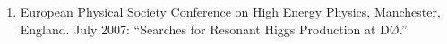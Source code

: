 \documentclass[amsmath,amssymb]{revtex4}
\def\dzero{D\O}
\begin{document}
\begin{enumerate}
``Radiation Damage Study of the \dzero\ Silicon Microstrip Tracker''
\item European Physical Society Conference on High Energy Physics, Manchester, England.  July 2007:
``Searches for Resonant Higgs Production at \dzero.''
\end{enumerate}
\end{document}

